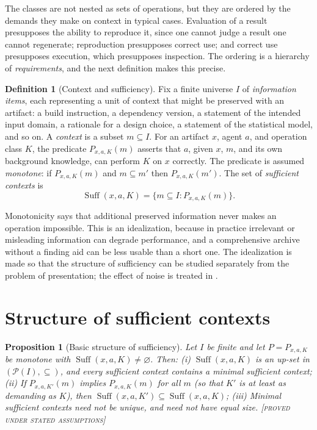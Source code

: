 \documentclass[11pt,twoside,openright]{book}
\theoremstyle{plain}
\newtheorem{proposition}[theorem]{Proposition}
\theoremstyle{definition}
\newtheorem{definition}[theorem]{Definition}
\theoremstyle{remark}
\newcommand{\Proved}{\textup{\textsc{[proved under stated assumptions]}}}
\newcommand{\Suff}{\operatorname{Suff}}
\newcommand{\Pow}{\mathcal{P}}
\begin{document}
The classes are not nested as sets of operations, but they are ordered by the demands they make on context in typical cases. Evaluation of a result presupposes the ability to reproduce it, since one cannot judge a result one cannot regenerate; reproduction presupposes correct use; and correct use presupposes execution, which presupposes inspection. The ordering is a hierarchy of \emph{requirements}, and the next definition makes this precise.

\begin{definition}[Context and sufficiency]\label{def:context}
Fix a finite universe $I$ of \emph{information items}, each representing a unit of context that might be preserved with an artifact: a build instruction, a dependency version, a statement of the intended input domain, a rationale for a design choice, a statement of the statistical model, and so on. A \emph{context} is a subset $m\subseteq I$. For an artifact $x$, agent $a$, and operation class $K$, the predicate $P_{x,a,K}(m)$ asserts that $a$, given $x$, $m$, and its own background knowledge, can perform $K$ on $x$ correctly. The predicate is assumed \emph{monotone}: if $P_{x,a,K}(m)$ and $m\subseteq m'$ then $P_{x,a,K}(m')$. The set of \emph{sufficient contexts} is
\[
\Suff(x,a,K)=\{m\subseteq I:P_{x,a,K}(m)\}.
\]
\end{definition}

Monotonicity says that additional preserved information never makes an operation impossible. This is an idealization, because in practice irrelevant or misleading information can degrade performance, and a comprehensive archive without a finding aid can be less usable than a short one. The idealization is made so that the structure of sufficiency can be studied separately from the problem of presentation; the effect of noise is treated in .

\section{Structure of sufficient contexts}

\begin{proposition}[Basic structure of sufficiency]\label{prop:suffstructure}
Let $I$ be finite and let $P=P_{x,a,K}$ be monotone with $\Suff(x,a,K)\neq\varnothing$. Then:
(i) $\Suff(x,a,K)$ is an up-set in $(\Pow(I),\subseteq)$, and every sufficient context contains a minimal sufficient context; (ii) If $P_{x,a,K'}(m)$ implies $P_{x,a,K}(m)$ for all $m$ (so that $K'$ is at least as demanding as $K$), then $\Suff(x,a,K')\subseteq\Suff(x,a,K)$; (iii) Minimal sufficient contexts need not be unique, and need not have equal size.
\Proved{}
\end{proposition}
\end{document}
